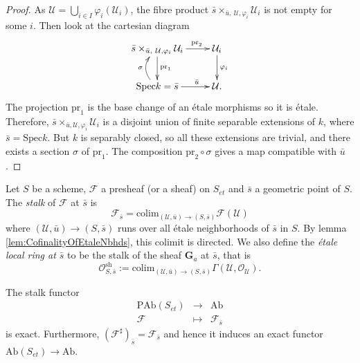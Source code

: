 \begin{proof}
As $\mathcal{U} = \bigcup_{i\in I}\varphi_i(\mathcal{U}_i)$, the fibre product 
$\bar s \times_{\bar u, \ \mathcal{U}, \varphi_i} \mathcal{U}_i$ is not empty 
for some $i$. Then look at the cartesian diagram
$$
\xymatrix{ 
{\bar s \times_{\bar u, \ \mathcal{U}, \varphi_i} \mathcal{U}_i} 
\ar^{\text{pr}_1}[d] \ar^{\qquad \text{pr}_2}[r] & {\mathcal{U}_i} 
\ar^{\varphi_i}[d] \\ 
{\text{Spec} k = \bar s} \ar@/^1pc/^{\sigma}[u] \ar^{\qquad \bar u}[r] & 
{\mathcal{U}.} 
}
$$
The projection $\text{pr}_1$ is the base change of an \'etale morphisms so it 
is \'etale. Therefore, $\bar s \times_{\bar u , \mathcal{U}, \varphi_i} 
\mathcal{U}_i$ is a disjoint union of finite separable extensions of $k$, where 
$\bar s = \text{Spec} k$. But $k$ is separably closed, so all these extensions 
are trivial, and there exists a section $\sigma$ of $\text{pr}_1$. The 
composition 
$\text{pr}_2 \circ \sigma$ gives a map compatible with $\bar u$.
\end{proof}

\begin{definition} \label{defi:EtaleLocalRings}
Let $S$ be a scheme, $\mathcal{F}$ a presheaf (or a sheaf) on $S_{et}$ and 
$\bar s$ a geometric point of $S$. The \emph{stalk} of $\mathcal{F}$ at $\bar 
s$ is  
$$
\mathcal{F}_{\bar s} = \text{colim}_{(\mathcal{U}, \bar u) \to (S,\bar s)} 
\mathcal{F}(\mathcal{U}) 
$$
where $(\mathcal{U}, \bar u) \to (S,\bar s)$ runs over all \'etale 
neighborhoods of $\bar s$ in $S$. By lemma \ref{lem:CofinalityOfEtaleNbhds}, 
this colimit is directed. We also define the \emph{\'etale local ring at $\bar 
s$} to be the stalk of the sheaf $\mathbf{G}_a$ at $\bar s$, that is
$$
\mathcal{O}_{S, \bar{s}}^\text{sh} := \text{colim}_{(\mathcal{U}, \bar u) \to 
(S,\bar s)} \Gamma(\mathcal{U}, \mathcal{O}_\mathcal{U}).
$$
\end{definition}

\begin{lemma}
The stalk functor 
$$
\begin{array}{rcl}
\text{PAb}(S_{et}) & \longrightarrow & \text{Ab}\\ 
\mathcal{F} & \longmapsto & \mathcal{F}_{\bar s}
\end{array}
$$ 
is exact. Furthermore, $\left(\mathcal{F}^\sharp\right)_{\bar s} = 
\mathcal{F}_{\bar s}$ and hence it induces an exact functor 
$\text{Ab}(S_{et})\to \text{Ab}$.
\end{lemma}

